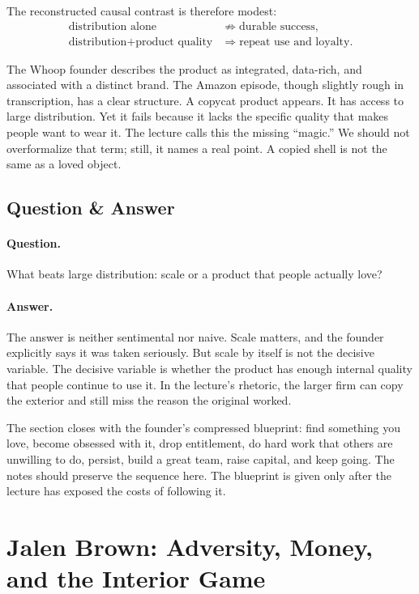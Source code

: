 The reconstructed causal contrast is therefore modest:
\begin{align}
\text{distribution alone} &\not\Rightarrow \text{durable success},\\
\text{distribution} + \text{product quality} &\Rightarrow \text{repeat use and loyalty}.
\end{align}

The Whoop founder describes the product as integrated, data-rich, and associated with a distinct brand. The Amazon episode, though slightly rough in transcription, has a clear structure. A copycat product appears. It has access to large distribution. Yet it fails because it lacks the specific quality that makes people want to wear it. The lecture calls this the missing ``magic.'' We should not overformalize that term; still, it names a real point. A copied shell is not the same as a loved object.

\subsection{Question \& Answer}

\paragraph{Question.} What beats large distribution: scale or a product that people actually love?

\paragraph{Answer.} The answer is neither sentimental nor naive. Scale matters, and the founder explicitly says it was taken seriously. But scale by itself is not the decisive variable. The decisive variable is whether the product has enough internal quality that people continue to use it. In the lecture's rhetoric, the larger firm can copy the exterior and still miss the reason the original worked.

The section closes with the founder's compressed blueprint: find something you love, become obsessed with it, drop entitlement, do hard work that others are unwilling to do, persist, build a great team, raise capital, and keep going. The notes should preserve the sequence here. The blueprint is given only after the lecture has exposed the costs of following it.

\section{Jalen Brown: Adversity, Money, and the Interior Game}

